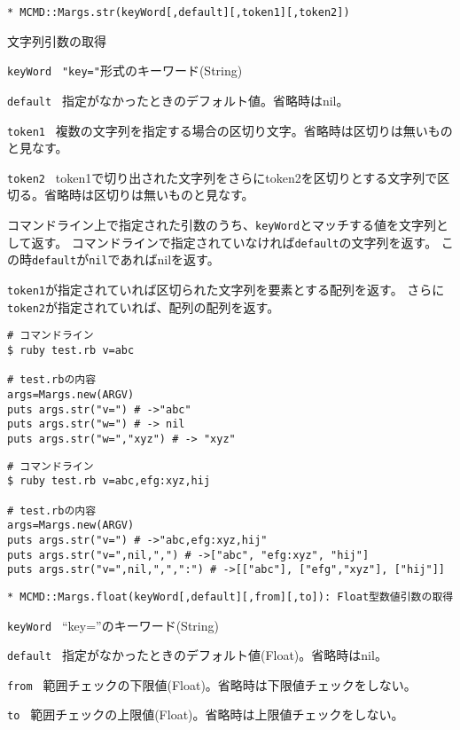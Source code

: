 {\Large
\begin{verbatim}
* MCMD::Margs.str(keyWord[,default][,token1][,token2])
\end{verbatim}
}
文字列引数の取得
\begin{description}
	\setlength{\itemindent}{0mm}
	\item {\large \verb/keyWord /} \verb/"key="/形式のキーワード(String)
	\item {\large \verb/default /} 指定がなかったときのデフォルト値。省略時はnil。
	\item {\large \verb/token1 /} 複数の文字列を指定する場合の区切り文字。省略時は区切りは無いものと見なす。
	\item {\large \verb/token2 /} token1で切り出された文字列をさらにtoken2を区切りとする文字列で区切る。省略時は区切りは無いものと見なす。
\end{description}

コマンドライン上で指定された引数のうち、\verb/keyWord/とマッチする値を文字列として返す。
コマンドラインで指定されていなければ\verb/default/の文字列を返す。
この時\verb/default/が\verb/nil/であればnilを返す。

\verb/token1/が指定されていれば区切られた文字列を要素とする配列を返す。
さらに\verb/token2/が指定されていれば、配列の配列を返す。

\begin{Verbatim}[baselinestretch=0.7,frame=single]
# コマンドライン
$ ruby test.rb v=abc

# test.rbの内容
args=Margs.new(ARGV)
puts args.str("v=") # ->"abc"
puts args.str("w=") # -> nil
puts args.str("w=","xyz") # -> "xyz"
\end{Verbatim}

\begin{Verbatim}[baselinestretch=0.7,frame=single]
# コマンドライン
$ ruby test.rb v=abc,efg:xyz,hij

# test.rbの内容
args=Margs.new(ARGV)
puts args.str("v=") # ->"abc,efg:xyz,hij"
puts args.str("v=",nil,",") # ->["abc", "efg:xyz", "hij"]
puts args.str("v=",nil,",",":") # ->[["abc"], ["efg","xyz"], ["hij"]]
\end{Verbatim}


{\Large
\begin{verbatim}
* MCMD::Margs.float(keyWord[,default][,from][,to]): Float型数値引数の取得
\end{verbatim}
}

\begin{description}
\item {\large \verb/keyWord /} ``key=''のキーワード(String)
\item {\large \verb/default /} 指定がなかったときのデフォルト値(Float)。省略時はnil。
\item {\large \verb/from /} 範囲チェックの下限値(Float)。省略時は下限値チェックをしない。
\item {\large \verb/to /} 範囲チェックの上限値(Float)。省略時は上限値チェックをしない。
\end{description}

